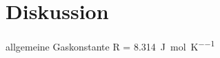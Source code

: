 \section{Diskussion}
\label{sec:Diskussion}
allgemeine Gaskonstante R = \SI{8,314}{\joule\per\mol\per\kelvin} \cite{codata}
